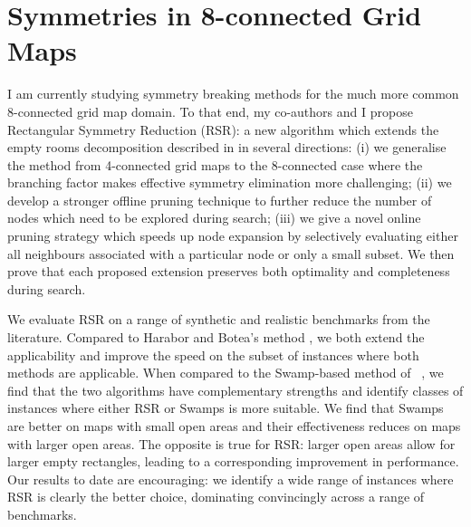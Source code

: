 \section{Symmetries in 8-connected Grid Maps}
I am currently studying symmetry breaking methods for the much more 
common 8-connected grid map domain.
To that end, my co-authors and I propose Rectangular Symmetry Reduction (RSR): 
a new algorithm which extends the empty rooms decomposition described in
\cite{harabor10} in several directions: (i) we generalise the method from
4-connected grid maps to the 8-connected case where the branching factor makes
effective symmetry elimination more challenging; (ii) we develop a stronger
offline pruning technique to further reduce the number of nodes which need to 
be explored during search; (iii) we give a novel online pruning strategy which
speeds up node expansion by selectively evaluating either all neighbours
associated with a particular node or only a small subset.  We then prove that 
each proposed extension preserves both optimality and completeness during
search.
\par
We evaluate RSR on a range of synthetic and realistic benchmarks from the
literature.
Compared to Harabor and Botea's method , 
we both extend the applicability and improve the speed
on the subset of instances where both methods are applicable.
When compared to the Swamp-based method of 
\citeauthor{pochter10}~, we find that the two algorithms
have complementary strengths and identify classes of instances where
either RSR or Swamps is more suitable.
We find that Swamps are better on maps with
small open areas and their effectiveness reduces on maps with larger open areas.
The opposite is true for RSR: larger open areas allow for larger empty rectangles,
leading to a corresponding improvement in performance.
Our results to date are encouraging: we identify a wide range of instances where
RSR is clearly the better choice, dominating convincingly across a range of
benchmarks. 
